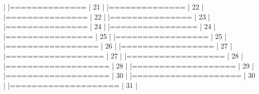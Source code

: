 \documentclass[10pt]{article}
\newenvironment{CodeChunk}{}{}
\begin{document}
\begin{CodeChunk}
\begin{CodeChunk}
\begin{CodeOutput}
  |                                                                       
  |==============                                                   |  21%
  |                                                                       
  |==============                                                   |  22%
  |                                                                       
  |===============                                                  |  22%
  |                                                                       
  |===============                                                  |  23%
  |                                                                       
  |===============                                                  |  24%
  |                                                                       
  |================                                                 |  24%
  |                                                                       
  |================                                                 |  25%
  |                                                                       
  |=================                                                |  25%
  |                                                                       
  |=================                                                |  26%
  |                                                                       
  |=================                                                |  27%
  |                                                                       
  |==================                                               |  27%
  |                                                                       
  |==================                                               |  28%
  |                                                                       
  |===================                                              |  28%
  |                                                                       
  |===================                                              |  29%
  |                                                                       
  |===================                                              |  30%
  |                                                                       
  |====================                                             |  30%
  |                                                                       
  |====================                                             |  31%
  |                                                                       

\end{CodeOutput}
\end{CodeChunk}
\end{CodeChunk}
\end{document}
